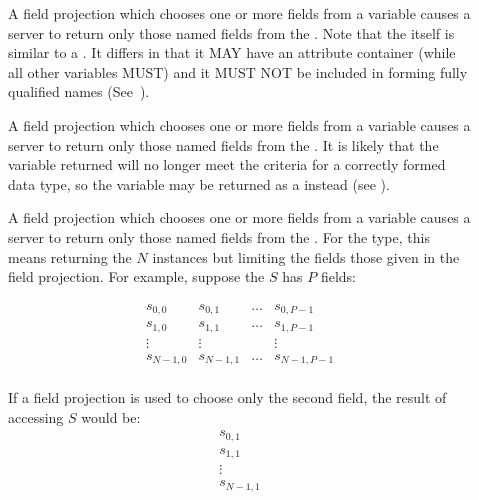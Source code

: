 \documentclass[justify]{nasa-ese}
\begin{document}
\begin{description}
  \item[\Structure] A field projection which chooses one or more fields from
  a \Structure variable causes a \DAP server to return only those named
  fields from the \Structure. Note that the \Dataset itself is similar to a
  \Structure. It differs in that it MAY have an attribute container (while
  all other variables MUST) and it MUST NOT be included in forming fully
  qualified names (See~).

  \item[\Grid] A field projection which chooses one or more fields from
  a \Grid variable causes a \DAP server to return only those named
  fields from the \Grid. It is likely that the variable returned will no
  longer meet the criteria for a correctly formed \Grid data type, so the
  variable may be returned as a \Structure instead (see 
  ).

  \item[\Sequence]  A field projection which chooses one or more fields from
  a \Sequence variable causes a \DAP server to return only those named
  fields from the \Sequence. For the \Sequence type, this means returning the
  $N$ instances but limiting the fields those given in the field
  projection. For example, suppose the \Sequence $S$ has $P$ fields:
  
 \begin{displaymath}
 \begin{array}{cccc}
   s_{0, 0} & s_{0, 1} & \ldots & s_{0, P-1} \\
   s_{1, 0} & s_{1, 1} & \ldots & s_{1, P-1} \\
    \vdots & \vdots  & & \vdots  \\
   s_{N-1, 0} & s_{N-1, 1} & \ldots & s_{N-1, P-1} \\
 \end{array}
 \end{displaymath} 
 
If a field projection is used to choose only the second field, the result of
accessing $S$ would be:
 \begin{displaymath}
 \begin{array}{c}
   s_{0, 1}\\
   s_{1, 1}\\
   \vdots \\
   s_{N-1, 1}\\
 \end{array}
 \end{displaymath}
\end{description}
\end{document}
